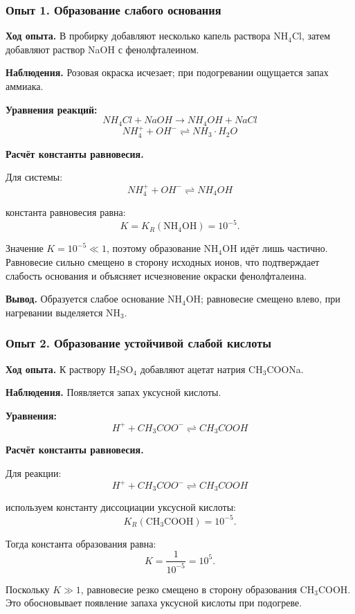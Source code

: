 \documentclass[a4paper,12pt]{article}
\begin{document}
	
	\subsubsection*{Опыт 1. Образование слабого основания}
	
	\quad \textbf{ Ход опыта.}  В пробирку добавляют несколько капель раствора NH$_4$Cl, затем добавляют раствор NaOH с фенолфталеином.
	
	\textbf{Наблюдения.}   Розовая окраска исчезает; при подогревании ощущается запах аммиака.
	
	\textbf{Уравнения реакций:}
	\[
	NH_4Cl + NaOH \rightarrow NH_4OH + NaCl
	\]
	\[
	NH_4^+ + OH^- \rightleftharpoons NH_3\cdot H_2O
	\]
	
	\textbf{Расчёт константы равновесия.}
	
	Для системы:
	\[
	NH_4^+ + OH^- \rightleftharpoons NH_4OH
	\]
	
	константа равновесия равна:
	\[
	K = K_R(\text{NH}_4\text{OH}) = 10^{-5}.
	\]
	
	Значение $K = 10^{-5} \ll 1$, поэтому образование NH$_4$OH идёт лишь частично.  
	Равновесие сильно смещено в сторону исходных ионов, что подтверждает слабость основания и объясняет исчезновение окраски фенолфталеина.
	
	\textbf{Вывод.}  
	Образуется слабое основание NH$_4$OH; равновесие смещено влево, при нагревании выделяется NH$_3$.
	
	
	\subsubsection*{Опыт 2. Образование устойчивой слабой кислоты}
	
	\quad \textbf{ Ход опыта.}  
	К раствору H$_2$SO$_4$ добавляют ацетат натрия CH$_3$COONa.
	
	\textbf{Наблюдения.}  
	Появляется запах уксусной кислоты.
	
	\textbf{Уравнения:}
	\[
	H^+ + CH_3COO^- \rightleftharpoons CH_3COOH
	\]
	
	\textbf{Расчёт константы равновесия.}
	
	Для реакции:
	\[
	H^+ + CH_3COO^- \rightleftharpoons CH_3COOH
	\]
	
	используем константу диссоциации уксусной кислоты:
	\[
	K_R(\text{CH}_3\text{COOH}) = 10^{-5}.
	\]
	
	Тогда константа образования равна:
	\[
	K = \frac{1}{10^{-5}} = 10^5.
	\]
	
	\quad Поскольку $K \gg 1$, равновесие резко смещено в сторону образования CH$_3$COOH.  
	Это обосновывает появление запаха уксусной кислоты при подогреве.
	
\end{document}
